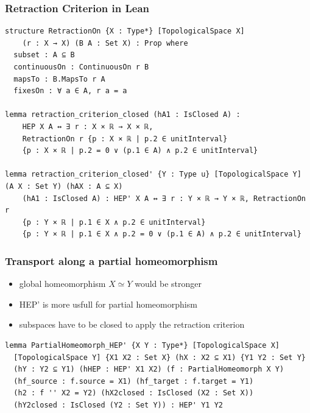 \documentclass{beamer}
\begin{document}
\begin{frame}[fragile]
\frametitle{Retraction Criterion in Lean}
\begin{lstlisting}
structure RetractionOn {X : Type*} [TopologicalSpace X] 
    (r : X → X) (B A : Set X) : Prop where
  subset : A ⊆ B
  continuousOn : ContinuousOn r B
  mapsTo : B.MapsTo r A
  fixesOn : ∀ a ∈ A, r a = a

lemma retraction_criterion_closed (hA1 : IsClosed A) :
    HEP X A ↔ ∃ r : X × ℝ → X × ℝ, 
    RetractionOn r {p : X × ℝ | p.2 ∈ unitInterval}
    {p : X × ℝ | p.2 = 0 ∨ (p.1 ∈ A) ∧ p.2 ∈ unitInterval}

lemma retraction_criterion_closed' {Y : Type u} [TopologicalSpace Y] (A X : Set Y) (hAX : A ⊆ X)
    (hA1 : IsClosed A) : HEP' X A ↔ ∃ r : Y × ℝ → Y × ℝ, RetractionOn r
    {p : Y × ℝ | p.1 ∈ X ∧ p.2 ∈ unitInterval}
    {p : Y × ℝ | p.1 ∈ X ∧ p.2 = 0 ∨ (p.1 ∈ A) ∧ p.2 ∈ unitInterval}
\end{lstlisting}
\end{frame}

\begin{frame}[fragile]
\frametitle{Transport along a partial homeomorphism}
\begin{itemize}
\item global homeomorphism $X \simeq Y$ would be stronger
\item HEP' is more usfull for partial homeomorphism
\item subspaces have to be closed to apply the retraction criterion
\end{itemize}
\begin{lstlisting}
lemma PartialHomeomorph_HEP' {X Y : Type*} [TopologicalSpace X] 
  [TopologicalSpace Y] {X1 X2 : Set X} (hX : X2 ⊆ X1) {Y1 Y2 : Set Y} 
  (hY : Y2 ⊆ Y1) (hHEP : HEP' X1 X2) (f : PartialHomeomorph X Y) 
  (hf_source : f.source = X1) (hf_target : f.target = Y1)
  (h2 : f '' X2 = Y2) (hX2closed : IsClosed (X2 : Set X)) 
  (hY2closed : IsClosed (Y2 : Set Y)) : HEP' Y1 Y2
\end{lstlisting}
\end{frame}
\end{document}
